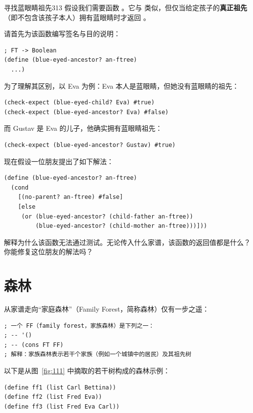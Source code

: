 \begin{exercise}{寻找蓝眼睛祖先}{313}
假设我们需要函数 。它与  类似，但仅当给定孩子的\textbf{真正祖先}（即不包含该孩子本人）拥有蓝眼睛时才返回 。

请首先为该函数编写签名与目的说明：
\begin{lstlisting}[language=BSL]
; FT -> Boolean
(define (blue-eyed-ancestor? an-ftree)
  ...)
\end{lstlisting}

为了理解其区别，以 Eva 为例：Eva 本人是蓝眼睛，但她没有蓝眼睛的祖先：
\begin{lstlisting}[language=BSL]
(check-expect (blue-eyed-child? Eva) #true)
(check-expect (blue-eyed-ancestor? Eva) #false)
\end{lstlisting}
而 Gustav 是 Eva 的儿子，他确实拥有蓝眼睛祖先：
\begin{lstlisting}[language=BSL]
(check-expect (blue-eyed-ancestor? Gustav) #true)
\end{lstlisting}

现在假设一位朋友提出了如下解法：
\begin{lstlisting}[language=BSL]
(define (blue-eyed-ancestor? an-ftree)
  (cond
    [(no-parent? an-ftree) #false]
    [else
     (or (blue-eyed-ancestor? (child-father an-ftree))
         (blue-eyed-ancestor? (child-mother an-ftree)))]))
\end{lstlisting}
解释为什么该函数无法通过测试。无论传入什么家谱，该函数的返回值都是什么？你能修复这位朋友的解法吗？
\end{exercise}

\section{森林 }
\label{sec:19.2_forests}

从家谱走向“家庭森林”（Family Forest，简称森林）仅有一步之遥：

\begin{lstlisting}[language=BSL]
; 一个 FF（family forest，家族森林）是下列之一：
; -- '()
; -- (cons FT FF)
; 解释：家族森林表示若干个家族（例如一个城镇中的居民）及其祖先树
\end{lstlisting}

以下是从图~\ref{fig:111} 中摘取的若干树构成的森林示例：

\begin{lstlisting}[language=BSL]
(define ff1 (list Carl Bettina))
(define ff2 (list Fred Eva))
(define ff3 (list Fred Eva Carl))
\end{lstlisting}

